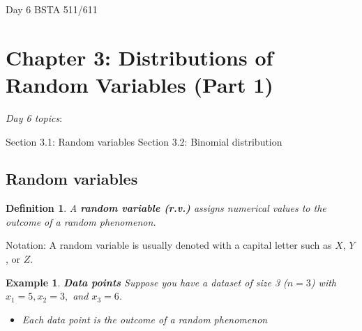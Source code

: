 \documentclass[12pt]{amsart}
\newtheorem{definition}[theorem]{Definition}
\newtheorem{example}[theorem]{Example}
\begin{document}
\setcounter{section}{3}
Day 6 BSTA 511/611
{\huge  
\section*{Chapter 3: Distributions of Random Variables (Part 1)}
}



{\large 

\emph{Day 6 topics}:

Section 3.1: Random variables  \newline
Section 3.2: Binomial distribution

\hrulefill
%
%
%
%
%
%


\subsection{Random variables}

\begin{definition} A \textbf{random variable (r.v.)} assigns numerical values to the outcome of a random phenomenon.
\end{definition}

Notation: \newline 
A random variable is usually denoted with a capital letter such as $X$, $Y$, or $Z$.

\vspace{1cm}
\begin{example}  \textbf{Data points} \newline
Suppose you have a dataset of size 3 ($n=3$) with $x_1 = 5, x_2 = 3,$ and $x_3 = 6$. 
\begin{itemize}
\item Each data point is the outcome of a random phenomenon


\end{itemize}
\end{example}}
\end{document}
